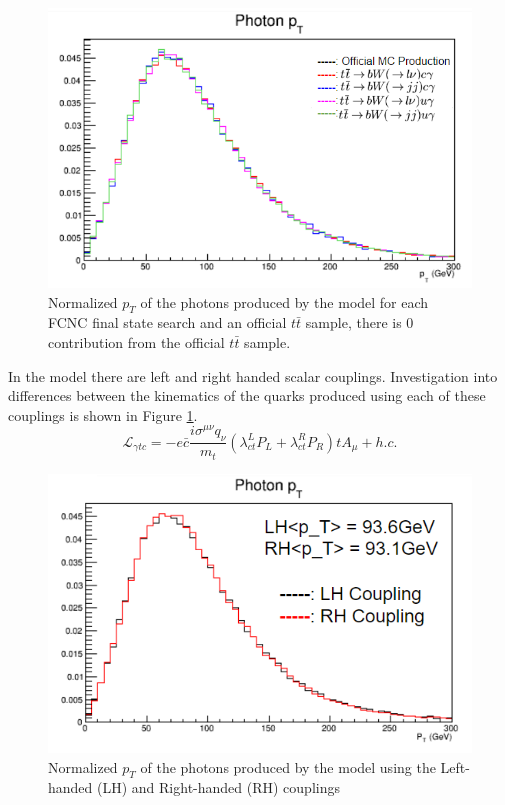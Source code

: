 \begin{figure}[h!]
	\centering
	\includegraphics[width=.8\columnwidth]{../ThesisImages/FCNCValidation/photon.png}
	\caption{Normalized $p_T$ of the photons produced by the model for each FCNC final state search and an official $t\bar{t}$ sample, there is 0 contribution from the official $t\bar{t}$ sample.
	}
\end{figure}

In the model there are left and right handed scalar couplings.  Investigation into differences between the kinematics of the quarks produced using each of these couplings is shown in Figure \ref{fig:LHRHcomp}.
\[ \mathcal{L}_{\gamma t c} = -e \bar{c} \frac{i\sigma^{\mu\nu}q_\nu}{m_t}(\lambda^L_{ct}P_L+\lambda^R_{ct}P_R )t A_\mu + h.c. \]

\begin{figure}[h!]
	\centering
	\includegraphics[width=.8\columnwidth]{../ThesisImages/FCNCValidation/PhotonLHRH.png}
	\caption{ Normalized $p_T$ of the photons produced by the model using the Left-handed (LH) and Right-handed (RH) couplings
	}
	\label{fig:LHRHcomp}
\end{figure}

